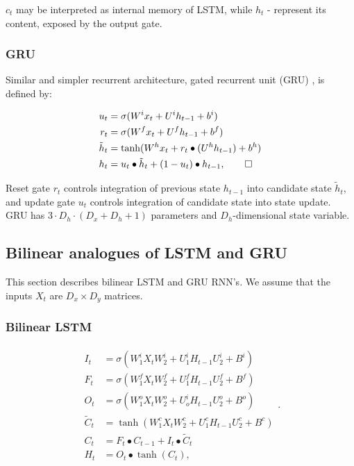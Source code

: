 \documentclass[a4paper,11pt]{article}
\begin{document}
$c_{t}$ may be interpreted as internal memory of LSTM, while $h_{t}$ - represent its content, exposed by the output gate.  

\subsubsection{GRU}
Similar and simpler recurrent architecture, gated recurrent unit (GRU) \cite{Chung}, is defined by:

\begin{align}
\begin{split}
\label{LSTM}
u_{t} &=\sigma(W^{i}x_{t} + U^{i}h_{t-1} + b^{i})\\
r_{t} &=\sigma(W^{f}x_{t} + U^{f}h_{t-1} + b^{f})\\
\tilde{h}_{t} &= \tanh(W^{h}x_{t} + r_{t} \bullet (U^{h}h_{t-1}) + b^{h})\\
h_{t} &= u_{t} \bullet \tilde{h}_{t} + (1 - u_{t}) \bullet h_{t-1}, \qedhere
\end{split}
\end{align}

\noindent Reset gate $r_{t}$ controls integration of previous state $h_{t-1}$ into candidate state $\tilde{h}_{t}$, and update gate $u_{t}$ controls integration of candidate state into state update. GRU has $ 3 \cdot D_{h} \cdot (D_{x}  + D_{h} + 1) $ parameters and $D_{h}$-dimensional state variable.

\subsection{Bilinear analogues of LSTM and GRU}

This section describes bilinear LSTM and GRU RNN's. We assume that the inputs $X_{t}$ are $D_{x} \times D_{y}$ matrices. 

\subsubsection{Bilinear LSTM} 

\begin{align}
\begin{split}
I_{t} &=\sigma(W_{1}^{i}X_{t}W_{2}^{i} + U_{1}^{i}H_{t-1}U_{2}^{i}  +  B^{i})\\
F_{t} &=\sigma(W_{1}^{f}X_{t}W_{2}^{f} + U_{1}^{f}H_{t-1}U_{2}^{f}  +  B^{f})\\
O_{t} &=\sigma(W_{1}^{o}X_{t}W_{2}^{o} + U_{o}^{i}H_{t-1}U_{2}^{o}  +  B^{o})\\
\tilde{C}_{t} &=\tanh(W_{1}^{c}X_{t}W_{2}^{c} + U_{1}^{c}H_{t-1}U_{2}^{c}  +  B^{c})\\
C_{t} &= F_{t} \bullet C_{t-1} + I_{t} \bullet \tilde{C}_{t}\\
H_{t} &= O_{t}\bullet \tanh(C_{t}),
\end{split}.
\end{align}
\end{document}
